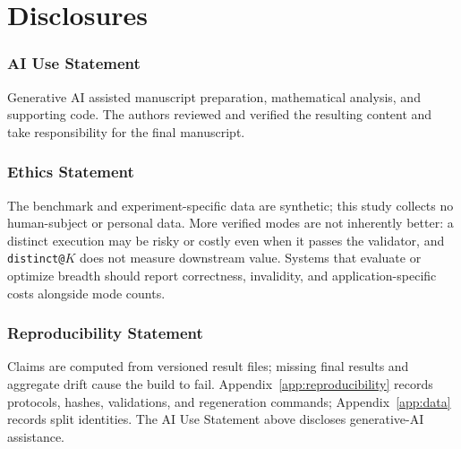 \documentclass{article}
\newcommand{\1}{\mathbf 1}
\theoremstyle{remark}
\theoremstyle{definition}
\theoremstyle{plain}
\begin{document}
\section{Disclosures}
\label{app:disclosures}

\subsubsection*{AI Use Statement}
\label{sec:ai-use}

Generative AI assisted manuscript preparation, mathematical analysis, and
supporting code. The authors reviewed and verified the resulting content and
take responsibility for the final manuscript.

\subsubsection*{Ethics Statement}

The benchmark and experiment-specific data are synthetic; this study collects
no human-subject or personal data. More verified modes are not inherently
better: a distinct execution may be risky or costly even when it passes the
validator, and \texttt{distinct@}$K$ does not measure downstream value. Systems
that evaluate or optimize breadth should report correctness, invalidity, and
application-specific costs alongside mode counts.

\subsubsection*{Reproducibility Statement}

Claims are computed from versioned result files; missing final results and aggregate drift cause the build to
fail. Appendix~\ref{app:reproducibility} records protocols, hashes, validations,
and regeneration commands; Appendix~\ref{app:data} records split identities.
The AI Use Statement above discloses generative-AI assistance.
\end{document}
